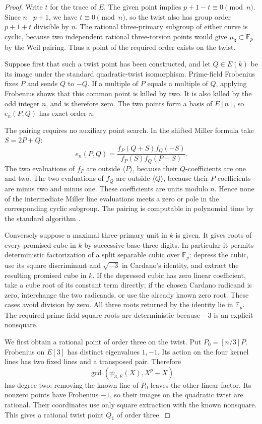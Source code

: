 \documentclass[11pt]{article}
\theoremstyle{definition}
\theoremstyle{remark}
\begin{document}
\begin{proof}
Write $t$ for the trace of $E$.  The given point implies
$p+1-t\equiv0\pmod n$.  Since $n\mid p+1$, we have
$t\equiv0\pmod n$, so the twist also has group order
$p+1+t$ divisible by $n$.
The rational three-primary subgroup of either curve is
cyclic, because two independent rational three-torsion
points would give $\mu_3\subset\mathbb F_p$ by the
Weil pairing.  Thus a point of the required order exists
on the twist.

Suppose first that such a twist point has been constructed,
and let $Q\in E(k)$ be its image under the standard
quadratic-twist isomorphism.  Prime-field Frobenius fixes
$P$ and sends $Q$ to $-Q$.  If a multiple of $P$ equals
a multiple of $Q$, applying Frobenius shows that this
common point is killed by two.  It is also killed by the
odd integer $n$, and is therefore zero.  The two points
form a basis of $E[n]$, so $e_n(P,Q)$ has exact order $n$.

The pairing requires no auxiliary point search.  In the
shifted Miller formula take $S=2P+Q$:
\[
 e_n(P,Q)=
 \frac{f_P(Q+S)f_Q(-S)}{f_P(S)f_Q(P-S)}.
\]
The two evaluations of $f_P$ are outside $\langle P\rangle$,
because their $Q$-coefficients are one and two.  The two
evaluations of $f_Q$ are outside $\langle Q\rangle$,
because their $P$-coefficients are minus two and minus one.
These coefficients are units modulo $n$.  Hence none of
the intermediate Miller line evaluations meets a zero or
pole in the corresponding cyclic subgroup.  The pairing
is computable in polynomial time by the standard algorithm
\cite[Theorem~XI.8.1 and Remark~XI.8.2, pp.~393--397]{Silverman2009}.

Conversely suppose a maximal three-primary unit in $k$ is
given.  It gives roots of every promised cube in $k$ by
successive base-three digits.  In particular it permits
deterministic factorization of a split separable cubic over
$\mathbb F_p$: depress the cubic, use its square
discriminant and $\sqrt{-3}$ in Cardano's identity, and
extract the resulting promised cube in $k$.  If the depressed cubic has zero linear coefficient, take a cube
root of its constant term directly; if the chosen Cardano radicand
is zero, interchange the two radicands, or use the already known
zero root. These cases avoid division by zero. All three
roots returned by the identity lie in $\mathbb F_p$.
The required prime-field square roots are deterministic
because $-3$ is an explicit nonsquare.

We first obtain a rational point of order three on the
twist.  Put $P_0=[n/3]P$.  Frobenius on $E[3]$ has
distinct eigenvalues $1,-1$.  Its action on the four
kernel lines has two fixed lines and a transposed pair.
Therefore
\[
 \gcd(\psi_{3,E}(X),X^p-X)
\]
has degree two; removing the known line of $P_0$ leaves
the other linear factor.  Its nonzero points have
Frobenius $-1$, so their images on the quadratic twist
are rational.  Their coordinates use only square
extraction with the known nonsquare.  This gives a
rational twist point $Q_1$ of order three.


\end{proof}
\end{document}
